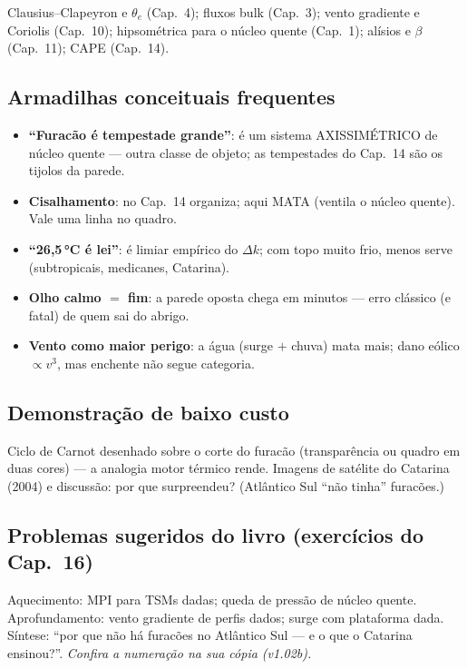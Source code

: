 Clausius--Clapeyron e $\theta_e$ (Cap.~4); fluxos bulk (Cap.~3);
vento gradiente e Coriolis (Cap.~10); hipsométrica para o núcleo
quente (Cap.~1); alísios e $\beta$ (Cap.~11); CAPE (Cap.~14).

\subsection*{Armadilhas conceituais frequentes}

\begin{itemize}
  \item \textbf{``Furacão é tempestade grande''}: é um sistema
        AXISSIMÉTRICO de núcleo quente — outra classe de objeto; as
        tempestades do Cap.~14 são os tijolos da parede.
  \item \textbf{Cisalhamento}: no Cap.~14 organiza; aqui MATA
        (ventila o núcleo quente). Vale uma linha no quadro.
  \item \textbf{``26,5\,°C é lei''}: é limiar empírico do $\Delta k$;
        com topo muito frio, menos serve (subtropicais, medicanes,
        Catarina).
  \item \textbf{Olho calmo $=$ fim}: a parede oposta chega em
        minutos — erro clássico (e fatal) de quem sai do abrigo.
  \item \textbf{Vento como maior perigo}: a água (surge $+$ chuva)
        mata mais; dano eólico $\propto v^3$, mas enchente não segue
        categoria.
\end{itemize}

\subsection*{Demonstração de baixo custo}

Ciclo de Carnot desenhado sobre o corte do furacão (transparência ou
quadro em duas cores) — a analogia motor térmico rende. Imagens de
satélite do Catarina (2004) e discussão: por que surpreendeu?
(Atlântico Sul ``não tinha'' furacões.)

\subsection*{Problemas sugeridos do livro (exercícios do Cap.~16)}

Aquecimento: MPI para TSMs dadas; queda de pressão de núcleo quente.
Aprofundamento: vento gradiente de perfis dados; surge com plataforma
dada. Síntese: ``por que não há furacões no Atlântico Sul — e o que o
Catarina ensinou?''. \emph{Confira a numeração na sua cópia (v1.02b).}

